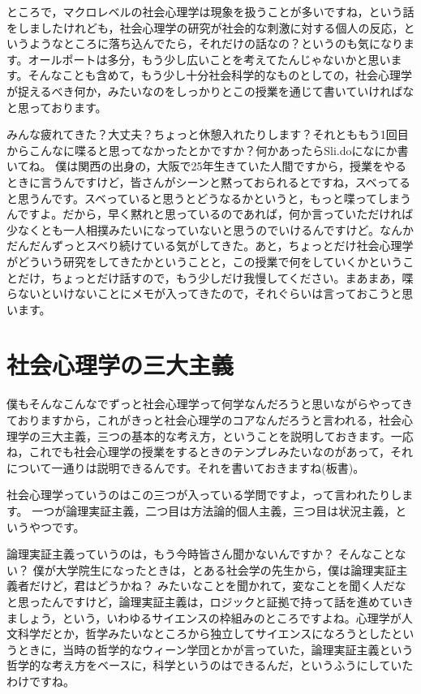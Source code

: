 \documentclass{ltjsbook}
\begin{document}
ところで，マクロレベルの社会心理学は現象を扱うことが多いですね，という話をしましたけれども，社会心理学の研究が社会的な刺激に対する個人の反応，というようなところに落ち込んでたら，それだけの話なの？というのも気になります。オールポートは多分，もう少し広いことを考えてたんじゃないかと思います。そんなことも含めて，もう少し十分社会科学的なものとしての，社会心理学が捉えるべき何か，みたいなのをしっかりとこの授業を通じて書いていければなと思っております。

みんな疲れてきた？大丈夫？ちょっと休憩入れたりします？それとももう1回目からこんなに喋ると思ってなかったとかですか？何かあったらSli.doになにか書いてね。
僕は関西の出身の，大阪で25年生きていた人間ですから，授業をやるときに言うんですけど，皆さんがシーンと黙っておられるとですね，スベってると思うんです。スベっていると思うとどうなるかというと，もっと喋ってしまうんですよ。だから，早く黙れと思っているのであれば，何か言っていただければ少なくとも一人相撲みたいになっていないと思うのでいけるんですけど。なんかだんだんずっとスベり続けている気がしてきた。あと，ちょっとだけ社会心理学がどういう研究をしてきたかということと，この授業で何をしていくかということだけ，ちょっとだけ話すので，もう少しだけ我慢してください。まあまあ，喋らないといけないことにメモが入ってきたので，それぐらいは言っておこうと思います。

\section{社会心理学の三大主義}

僕もそんなこんなでずっと社会心理学って何学なんだろうと思いながらやってきておりますから，これがきっと社会心理学のコアなんだろうと言われる，社会心理学の三大主義，三つの基本的な考え方，ということを説明しておきます。一応ね，これでも社会心理学の授業をするときのテンプレみたいなのがあって，それについて一通りは説明できるんです。それを書いておきますね(板書)。

社会心理学っていうのはこの三つが入っている学問ですよ，って言われたりします。
一つが論理実証主義，二つ目は方法論的個人主義，三つ目は状況主義，というやつです。

論理実証主義っていうのは，もう今時皆さん聞かないんですか？ そんなことない？ 僕が大学院生になったときは，とある社会学の先生から，僕は論理実証主義者だけど，君はどうかね？ みたいなことを聞かれて，変なことを聞く人だなと思ったんですけど，論理実証主義は，ロジックと証拠で持って話を進めていきましょう，という，いわゆるサイエンスの枠組みのところですよね。心理学が人文科学だとか，哲学みたいなところから独立してサイエンスになろうとしたというときに，当時の哲学的なウィーン学団とかが言っていた，論理実証主義という哲学的な考え方をベースに，科学というのはできるんだ，というふうにしていたわけですね。
\end{document}
